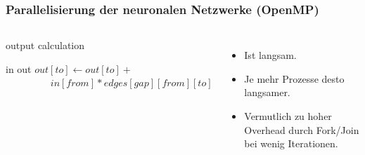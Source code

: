 \begin{frame}
    \frametitle{Parallelisierung der neuronalen Netzwerke (OpenMP)}
    \begin{columns}[t]
        \vspace{-0.5cm}
        \begin{algorithm}[H]
            \caption{output calculation}
            \begin{algorithmic}[1]
                \Require in
                \Ensure out
                    \State {}
                        \State $out[to] \gets out[to] +{}$
                        \State $\qquad\qquad\;\; in[from] * edges[gap][from][to]$
                        \EndFor
                    \EndParDo
                    \State {}
                \EndFor
            \end{algorithmic}
        \end{algorithm}
        \vspace{-0.5cm}
        \begin{itemize}
            \item Ist langsam.
            \item Je mehr Prozesse desto langsamer.
            \item Vermutlich zu hoher Overhead durch Fork/Join bei wenig Iterationen.
        \end{itemize}
    \end{columns}
\end{frame}
